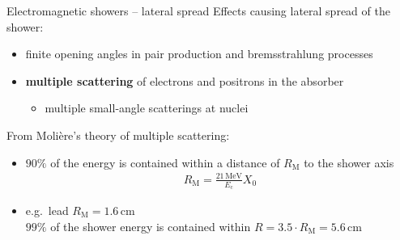 \documentclass[11pt,xcolor=dvipsnames,professionalfonts,notes]{beamer}
\begin{document}

\begin{frame}{Electromagnetic showers -- lateral spread}
	Effects causing lateral spread of the shower:
	\begin{itemize}
		\setlength\itemsep{1.5em}
		\item finite opening angles in pair production and bremsstrahlung processes
		
		\item \textbf{multiple scattering}{\tiny } of electrons and positrons in the absorber
		\begin{itemize}
			\item multiple small-angle scatterings at nuclei
		\end{itemize}		
	\end{itemize}
	\vfill
	From Molière's theory of multiple scattering:
	\begin{itemize}
		\item $90\%$ of the energy is contained within a distance of $R_\mathrm{M}$ to the shower axis
				\begin{align*}
				R_\mathrm{M} = \frac{21\,\mathrm{MeV}}{E_\mathrm{c}} X_0
				\end{align*}
		\item e.g.\ lead $R_\mathrm{M} = 1.6 \, \mathrm{cm}$\\ $99\%$ of the shower energy is contained within $R = 3.5 \cdot R_\mathrm{M} = 5.6 \, \mathrm{cm}$
	\end{itemize}
\end{frame}
\end{document}
